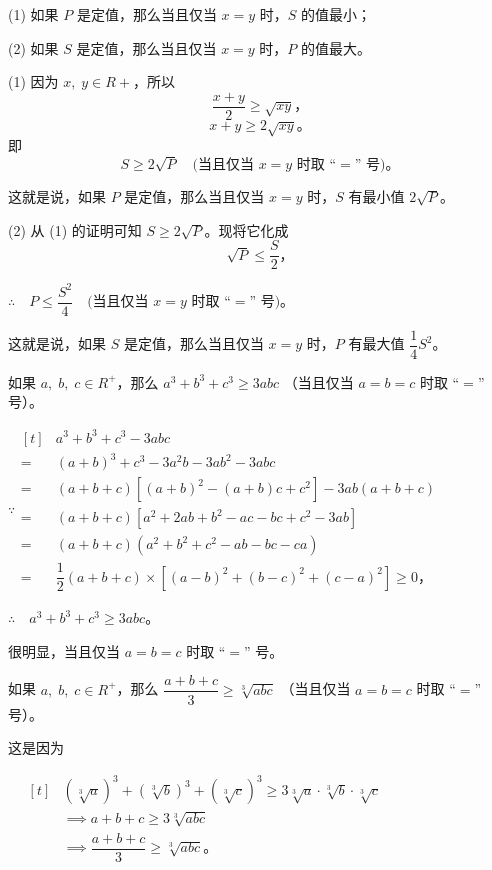(1) 如果 $P$ 是定值，那么当且仅当 $x = y$ 时，$S$ 的值最小；

(2) 如果 $S$ 是定值，那么当且仅当 $x = y$ 时，$P$ 的值最大。

\zhengming (1) 因为 $x,\; y \in R+$，所以
$$ \dfrac{x + y}{2} \geqslant \sqrt{xy} \text{，}$$
$$ x + y \geqslant 2\sqrt{xy} \text{。}$$
即
$$ S \geqslant 2\sqrt{P} \quad \text{(当且仅当 $x = y$ 时取 “$=$” 号)。}$$

这就是说，如果 $P$ 是定值，那么当且仅当 $x = y$ 时，$S$ 有最小值 $2\sqrt{P}$。

(2) 从 (1) 的证明可知 $S \geqslant 2\sqrt{P}$。现将它化成
$$ \sqrt{P} \leqslant \dfrac{S}{2} \text{，} $$

$\therefore \quad P \leqslant \dfrac{S^2}{4} \quad \text{(当且仅当 $x = y$ 时取 “$=$” 号)。}$

这就是说，如果 $S$ 是定值，那么当且仅当 $x = y$ 时，$P$ 有最大值 $\dfrac{1}{4} S^2$。


\begin{theorem} \label{theorem:bdszm-2}
    如果 $a,\; b,\; c \in R^+$，那么 $a^3 + b^3 + c^3 \geqslant 3abc$ （当且仅当 $a = b = c$ 时取 “$=$” 号）。
\end{theorem}

\zhengming $\because \begin{aligned}[t]
        & a^3 + b^3 + c^3 - 3abc \\
    ={} & (a + b)^3 + c^3 - 3a^2b - 3ab^2 - 3abc \\
    ={} & (a + b + c)[(a + b)^2 - (a + b)c + c^2] - 3ab(a + b + c) \\
    ={}   & (a + b + c)[a^2 + 2ab + b^2 -ac - bc + c^2 -3ab] \\
    ={} & (a + b + c)(a^2 + b^2 + c^2 -ab - bc - ca) \\
    ={} & \dfrac{1}{2}(a + b + c) \times [(a - b)^2 + (b - c)^2 + (c - a)^2] \geqslant 0 \text{，}
\end{aligned}$

$\therefore \quad a^3 + b^3 + c^3 \geqslant 3abc$。

很明显，当且仅当 $a = b = c$ 时取 “$=$” 号。

\begin{corollary} \label{corollary:bdszm-2-1}
    如果 $a,\; b,\; c \in R^+$，那么 $\dfrac{a + b + c}{3} \geqslant \sqrt[3]{abc}$ （当且仅当 $a = b = c$ 时取 “$=$” 号）。
\end{corollary}

这是因为

$\quad \begin{aligned}[t]
    & (\sqrt[3]{a})^3 + (\sqrt[3]{b})^3 + (\sqrt[3]{c})^3 \geqslant 3 \sqrt[3]{a} \cdot \sqrt[3]{b} \cdot \sqrt[3]{c} \\
    & \implies a + b + c \geqslant 3 \sqrt[3]{abc} \\
    & \implies \dfrac{a + b + c}{3} \geqslant \sqrt[3]{abc} \text{。}
\end{aligned}$


